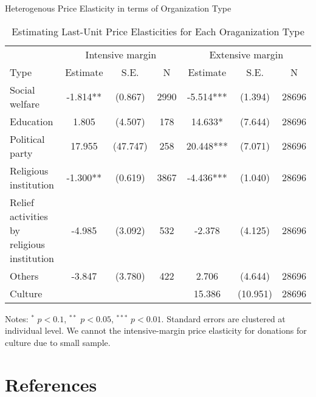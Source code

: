 \documentclass[
  ignorenonframetext,
  aspectratio=169,
]{beamer}
\begin{document}
\begin{frame}{Heterogenous Price Elasticity in terms of Organization Type}
\protect\hypertarget{heterogenous-price-elasticity-in-terms-of-organization-type}{}
\begin{table}

\caption{\label{tab:TypeHeteroElasticity}Estimating Last-Unit Price Elasticities for Each Oraganization Type}
\centering
\fontsize{8}{10}\selectfont
\begin{threeparttable}
\begin{tabular}[t]{lcccccc}
\toprule
\multicolumn{1}{c}{ } & \multicolumn{3}{c}{Intensive margin} & \multicolumn{3}{c}{Extensive margin} \\
\cmidrule(l{3pt}r{3pt}){2-4} \cmidrule(l{3pt}r{3pt}){5-7}
Type & Estimate & S.E. & N & Estimate & S.E. & N\\
\midrule
Social welfare & -1.814** & (0.867) & 2990 & -5.514*** & (1.394) & 28696\\
Education & 1.805 & (4.507) & 178 & 14.633* & (7.644) & 28696\\
Political party & 17.955 & (47.747) & 258 & 20.448*** & (7.071) & 28696\\
Religious institution & -1.300** & (0.619) & 3867 & -4.436*** & (1.040) & 28696\\
Relief activities by religious institution & -4.985 & (3.092) & 532 & -2.378 & (4.125) & 28696\\
Others & -3.847 & (3.780) & 422 & 2.706 & (4.644) & 28696\\
Culture &  &  &  & 15.386 & (10.951) & 28696\\
\bottomrule
\end{tabular}
\begin{tablenotes}
\item Notes: $^{*}$ $p < 0.1$, $^{**}$ $p < 0.05$, $^{***}$ $p < 0.01$. Standard errors are clustered at individual level. We cannot the intensive-margin price elasticity for donations for culture due to small sample.
\end{tablenotes}
\end{threeparttable}
\end{table}
\end{frame}

\hypertarget{references}{%
\section*{References}\label{references}}
\end{document}
